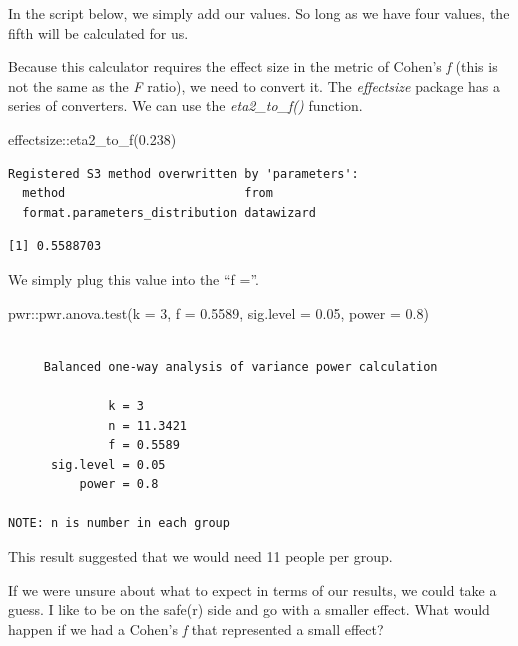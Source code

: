 \documentclass[
  11pt,
]{book}
\newenvironment{Shaded}{\begin{snugshade}}{\end{snugshade}}
\newcommand{\AttributeTok}[1]{\textcolor[rgb]{0.77,0.63,0.00}{#1}}
\newcommand{\DecValTok}[1]{\textcolor[rgb]{0.00,0.00,0.81}{#1}}
\newcommand{\FloatTok}[1]{\textcolor[rgb]{0.00,0.00,0.81}{#1}}
\newcommand{\FunctionTok}[1]{\textcolor[rgb]{0.00,0.00,0.00}{#1}}
\newcommand{\NormalTok}[1]{#1}
\newcommand{\SpecialCharTok}[1]{\textcolor[rgb]{0.00,0.00,0.00}{#1}}
\begin{document}
In the script below, we simply add our values. So long as we have four values, the fifth will be calculated for us.

Because this calculator requires the effect size in the metric of Cohen's \emph{f} (this is not the same as the \emph{F} ratio), we need to convert it. The \emph{effectsize} package has a series of converters. We can use the \emph{eta2\_to\_f()} function.

\begin{Shaded}
\begin{Highlighting}[]
\NormalTok{effectsize}\SpecialCharTok{::}\FunctionTok{eta2\_to\_f}\NormalTok{(}\FloatTok{0.238}\NormalTok{)}
\end{Highlighting}
\end{Shaded}

\begin{verbatim}
Registered S3 method overwritten by 'parameters':
  method                         from      
  format.parameters_distribution datawizard
\end{verbatim}

\begin{verbatim}
[1] 0.5588703
\end{verbatim}

We simply plug this value into the ``f =''.

\begin{Shaded}
\begin{Highlighting}[]
\NormalTok{pwr}\SpecialCharTok{::}\FunctionTok{pwr.anova.test}\NormalTok{(}\AttributeTok{k =} \DecValTok{3}\NormalTok{, }\AttributeTok{f =} \FloatTok{0.5589}\NormalTok{, }\AttributeTok{sig.level =} \FloatTok{0.05}\NormalTok{, }\AttributeTok{power =} \FloatTok{0.8}\NormalTok{)}
\end{Highlighting}
\end{Shaded}

\begin{verbatim}

     Balanced one-way analysis of variance power calculation 

              k = 3
              n = 11.3421
              f = 0.5589
      sig.level = 0.05
          power = 0.8

NOTE: n is number in each group
\end{verbatim}

This result suggested that we would need 11 people per group.

If we were unsure about what to expect in terms of our results, we could take a guess. I like to be on the safe(r) side and go with a smaller effect. What would happen if we had a Cohen's \emph{f} that represented a small effect?
\end{document}
